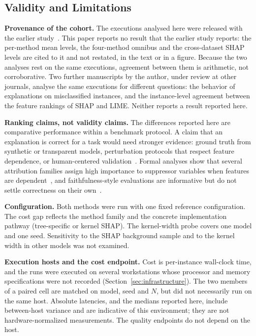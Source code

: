 \documentclass{cleiej}
\begin{document}
\subsection{Validity and Limitations}
\label{sec:validity}

\textbf{Provenance of the cohort.} The executions analysed here were
released with the earlier study~\cite{herrera2026framework}. This paper
reports no result that the earlier study reports: the per-method mean
levels, the four-method omnibus and the cross-dataset SHAP levels are cited
to it and not restated, in the text or in a figure. Because the two
analyses rest on the same executions, agreement between them is arithmetic,
not corroborative. Two further manuscripts by the author, under review at
other journals, analyse the same executions for different questions: the
behavior of explanations on misclassified instances, and the instance-level
agreement between the feature rankings of SHAP and LIME. Neither reports a
result reported here.

\textbf{Ranking claims, not validity claims.} The differences reported here
are comparative performance within a benchmark protocol. A claim that an
explanation is correct for a task would need stronger evidence: ground
truth from synthetic or transparent models, perturbation protocols that
respect feature dependence, or human-centered
validation~\cite{haufe2026formalization,doshivelez2017rigorous}. Formal
analyses show that several attribution families assign high importance to
suppressor variables when features are
dependent~\cite{wilming2022scrutinizing,wilming2023theoretical}, and
faithfulness-style evaluations are informative but do not settle
correctness on their own~\cite{jacovi2020faithfulness,rong2022consistent}.

\textbf{Configuration.} Both methods were run with one fixed reference
configuration. The cost gap reflects the method family and the concrete
implementation pathway (tree-specific or kernel SHAP). The kernel-width
probe covers one model and one seed. Sensitivity to the SHAP background
sample and to the kernel width in other models was not examined.

\textbf{Execution hosts and the cost endpoint.} Cost is per-instance
wall-clock time, and the runs were executed on several workstations whose
processor and memory specifications were not recorded
(Section~\ref{sec:infrastructure}). The two members of a paired cell are
matched on model, seed and $N$, but did not necessarily run on the same
host. Absolute latencies, and the medians reported here, include
between-host variance and are indicative of this environment; they are not
hardware-normalized measurements. The quality endpoints do not depend on
the host.
\end{document}

